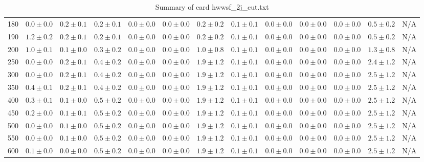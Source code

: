 \begin{table}
{\begin{center}
\begin{tabular}{l | c c | c c c c c c c c  | c c}
180 & $0.0\pm0.0$ & $0.2\pm0.1$ & $0.2\pm0.1$ & $0.0\pm0.0$ & $0.0\pm0.0$ & $0.2\pm0.2$ & $0.1\pm0.1$ & $0.0\pm0.0$ & $0.0\pm0.0$ & $0.0\pm0.0$ & $0.5\pm0.2$ & N/A \\
190 & $1.2\pm0.2$ & $0.2\pm0.1$ & $0.2\pm0.1$ & $0.0\pm0.0$ & $0.0\pm0.0$ & $0.2\pm0.2$ & $0.1\pm0.1$ & $0.0\pm0.0$ & $0.0\pm0.0$ & $0.0\pm0.0$ & $0.5\pm0.2$ & N/A \\
200 & $1.0\pm0.1$ & $0.1\pm0.0$ & $0.3\pm0.2$ & $0.0\pm0.0$ & $0.0\pm0.0$ & $1.0\pm0.8$ & $0.1\pm0.1$ & $0.0\pm0.0$ & $0.0\pm0.0$ & $0.0\pm0.0$ & $1.3\pm0.8$ & N/A \\
250 & $0.0\pm0.0$ & $0.2\pm0.1$ & $0.4\pm0.2$ & $0.0\pm0.0$ & $0.0\pm0.0$ & $1.9\pm1.2$ & $0.1\pm0.1$ & $0.0\pm0.0$ & $0.0\pm0.0$ & $0.0\pm0.0$ & $2.4\pm1.2$ & N/A \\
300 & $0.0\pm0.0$ & $0.2\pm0.1$ & $0.4\pm0.2$ & $0.0\pm0.0$ & $0.0\pm0.0$ & $1.9\pm1.2$ & $0.1\pm0.1$ & $0.0\pm0.0$ & $0.0\pm0.0$ & $0.0\pm0.0$ & $2.5\pm1.2$ & N/A \\
350 & $0.4\pm0.1$ & $0.2\pm0.1$ & $0.4\pm0.2$ & $0.0\pm0.0$ & $0.0\pm0.0$ & $1.9\pm1.2$ & $0.1\pm0.1$ & $0.0\pm0.0$ & $0.0\pm0.0$ & $0.0\pm0.0$ & $2.5\pm1.2$ & N/A \\
400 & $0.3\pm0.1$ & $0.1\pm0.0$ & $0.5\pm0.2$ & $0.0\pm0.0$ & $0.0\pm0.0$ & $1.9\pm1.2$ & $0.1\pm0.1$ & $0.0\pm0.0$ & $0.0\pm0.0$ & $0.0\pm0.0$ & $2.5\pm1.2$ & N/A \\
450 & $0.2\pm0.0$ & $0.1\pm0.1$ & $0.5\pm0.2$ & $0.0\pm0.0$ & $0.0\pm0.0$ & $1.9\pm1.2$ & $0.1\pm0.1$ & $0.0\pm0.0$ & $0.0\pm0.0$ & $0.0\pm0.0$ & $2.5\pm1.2$ & N/A \\
500 & $0.0\pm0.0$ & $0.1\pm0.0$ & $0.5\pm0.2$ & $0.0\pm0.0$ & $0.0\pm0.0$ & $1.9\pm1.2$ & $0.1\pm0.1$ & $0.0\pm0.0$ & $0.0\pm0.0$ & $0.0\pm0.0$ & $2.5\pm1.2$ & N/A \\
550 & $0.0\pm0.0$ & $0.1\pm0.0$ & $0.5\pm0.2$ & $0.0\pm0.0$ & $0.0\pm0.0$ & $1.9\pm1.2$ & $0.1\pm0.1$ & $0.0\pm0.0$ & $0.0\pm0.0$ & $0.0\pm0.0$ & $2.5\pm1.2$ & N/A \\
600 & $0.1\pm0.0$ & $0.0\pm0.0$ & $0.5\pm0.2$ & $0.0\pm0.0$ & $0.0\pm0.0$ & $1.9\pm1.2$ & $0.1\pm0.1$ & $0.0\pm0.0$ & $0.0\pm0.0$ & $0.0\pm0.0$ & $2.5\pm1.2$ & N/A \\
\hline
\end{tabular}
\end{center}
}
\caption{Summary of card hwwsf\_2j\_cut.txt}
\end{table}
